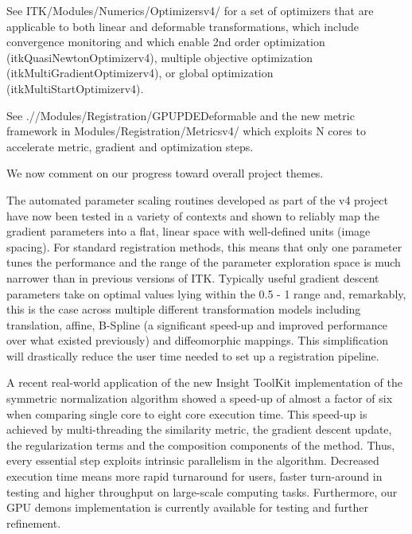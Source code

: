 \documentclass{frontiersSCNS}
\begin{document}
See ITK/Modules/Numerics/Optimizersv4/ for a set of optimizers that are applicable to both linear and deformable transformations, which include convergence monitoring and which enable 2nd order optimization (itkQuasiNewtonOptimizerv4), multiple objective optimization (itkMultiGradientOptimizerv4), or global optimization (itkMultiStartOptimizerv4).  

See .//Modules/Registration/GPUPDEDeformable and the new metric framework in Modules/Registration/Metricsv4/ which exploits N cores to accelerate metric, gradient and optimization steps.  

We now comment on our progress toward overall project themes.

The automated parameter scaling routines developed as part of the v4 project have now been tested in a variety of contexts and shown to reliably map the gradient parameters into a flat, linear space with well-defined units (image spacing). For standard registration methods, this means that only one parameter tunes the performance and the range of the parameter exploration space is much narrower than in previous versions of ITK. Typically useful gradient descent parameters take on optimal values lying within the 0.5 - 1 range and, remarkably, this is the case across multiple different transformation models including translation, affine, B-Spline (a significant speed-up and improved performance over what existed previously) and diffeomorphic mappings. This simplification will drastically reduce the user time needed to set up a registration pipeline. 

A recent real-world application of the new Insight ToolKit implementation of the symmetric normalization algorithm showed a speed-up of almost a factor of six when comparing single core to eight core execution time. This speed-up is achieved by multi-threading the similarity metric, the gradient descent update, the regularization terms and the composition components of the method. Thus, every essential step exploits intrinsic parallelism in the algorithm. Decreased execution time means more rapid turnaround for users, faster turn-around in testing and higher throughput on large-scale computing tasks.  Furthermore, our GPU demons implementation is currently available for testing and further refinement.
\end{document}
